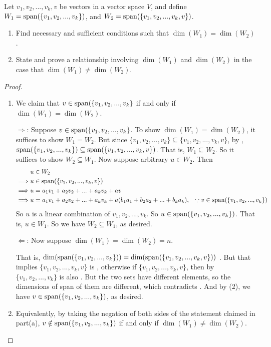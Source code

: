 \begin{exercise} \label{exercise 1.6.23}
\sloppy Let \(v_1, v_2, ..., v_k, v\) be vectors in a vector space \(V\), and define \(W_1 = \operatorname{span}(\{v_1, v_2, ..., v_k\})\), and \(W_2 = \operatorname{span}(\{ v_1, v_2, ..., v_k, v \})\).
\begin{enumerate}
\item Find necessary and sufficient conditions  such that \(\dim(W_1) = \dim(W_2)\).
\item State and prove a relationship involving \(\dim(W_1)\) and \(\dim(W_2)\) in the case that \(\dim(W_1) \ne \dim(W_2)\).
\end{enumerate}
\end{exercise}

\begin{proof}\ 

\begin{enumerate}
\item We claim that \(v \in \operatorname{span}(\{ v_1, v_2, ..., v_k \}\) if and only if \(\dim(W_1) = \dim(W_2)\).

\(\Longrightarrow\): Suppose \(v \in \operatorname{span}(\{ v_1, v_2, ..., v_k \}\).
To show \(\dim(W_1) = \dim(W_2)\), it suffices to show \(W_1 = W_2\).
But since \(\{ v_1, v_2, ..., v_k \} \subseteq \{ v_1, v_2, ..., v_k, v \}\), by , \(\operatorname{span}(\{ v_1, v_2, ..., v_k \}) \subseteq \operatorname{span}(\{ v_1, v_2, ..., v_k, v \})\).
That is, \(W_1 \subseteq W_2\).
So it suffices to show \(W_2 \subseteq W_1\).
Now suppose arbitrary \(u \in W_2\).
Then
\begin{align*}
             & u \in W_2 \\
    \implies & u \in \operatorname{span}(\{ v_1, v_2, ..., v_k, v \}) \\
    \implies & u = a_1 v_1 + a_2 v_2 + ... + a_k v_k + a v \\
    \implies & u = a_1 v_1 + a_2 v_2 + ... + a_k v_k + a (b_1 a_1 + b_2 a_2 + ... + b_k a_k), & \text{\(\because v \in \operatorname{span}(\{ v_1, v_2, ..., v_k \})\)}
\end{align*}
So \(u\) is a linear combination of \(v_1, v_2, ..., v_k\).
So \(u \in \operatorname{span}(\{ v_1, v_2, ..., v_k \})\).
That is, \(u \in W_1\).
So we have \(W_2 \subseteq W_1\), as desired.

\(\Longleftarrow\): Now suppose \(\dim(W_1) = \dim(W_2) = n\).

That is, \(\dim(\operatorname{span}(\{ v_1, v_2, ..., v_k \})) = \dim(\operatorname{span}(\{ v_1, v_2, ..., v_k, v \}))\) .
But that implies \(\{ v_1, v_2, ..., v_k, v \}\) is \LDP{}, otherwise if \(\{ v_1, v_2, ..., v_k, v \}\), then by  \(\{ v_1, v_2, ..., v_k \}\) is also \LID{}.
But the two sets have different elements, so the dimensions of span of them are different, which contradicts .
And by (2), we have \(v \in \operatorname{span}(\{ v_1, v_2, ..., v_k \})\), as desired.

\item Equivalently, by taking the negation of both sides of the statement claimed in part(a), \(v \notin \operatorname{span}(\{ v_1, v_2, ..., v_k \})\) if and only if \(\dim(W_1) \ne \dim(W_2)\).
\end{enumerate}
\end{proof}

